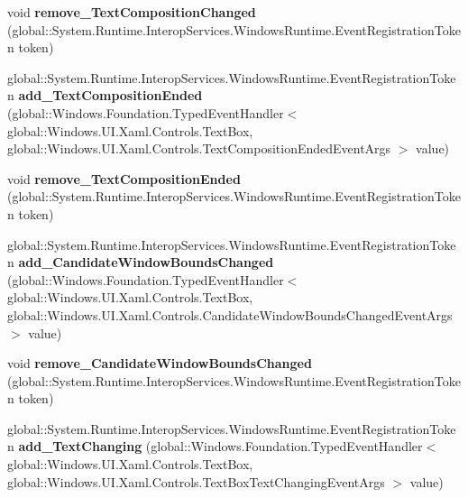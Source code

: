 \begin{DoxyCompactItemize}
void {\bfseries remove\+\_\+\+Text\+Composition\+Changed} (global\+::\+System.\+Runtime.\+Interop\+Services.\+Windows\+Runtime.\+Event\+Registration\+Token token)
\item 
\mbox{\label{interface_windows_1_1_u_i_1_1_xaml_1_1_controls_1_1_i_text_box3_a954246509dfb0e6ccf8afcceb314875e}} 
global\+::\+System.\+Runtime.\+Interop\+Services.\+Windows\+Runtime.\+Event\+Registration\+Token {\bfseries add\+\_\+\+Text\+Composition\+Ended} (global\+::\+Windows.\+Foundation.\+Typed\+Event\+Handler$<$ global\+::\+Windows.\+U\+I.\+Xaml.\+Controls.\+Text\+Box, global\+::\+Windows.\+U\+I.\+Xaml.\+Controls.\+Text\+Composition\+Ended\+Event\+Args $>$ value)
\item 
\mbox{\label{interface_windows_1_1_u_i_1_1_xaml_1_1_controls_1_1_i_text_box3_a1eca96501dfb3670f5fe1de3606e2c05}} 
void {\bfseries remove\+\_\+\+Text\+Composition\+Ended} (global\+::\+System.\+Runtime.\+Interop\+Services.\+Windows\+Runtime.\+Event\+Registration\+Token token)
\item 
\mbox{\label{interface_windows_1_1_u_i_1_1_xaml_1_1_controls_1_1_i_text_box3_af4821dda073f7c190c8b91cbd457a08d}} 
global\+::\+System.\+Runtime.\+Interop\+Services.\+Windows\+Runtime.\+Event\+Registration\+Token {\bfseries add\+\_\+\+Candidate\+Window\+Bounds\+Changed} (global\+::\+Windows.\+Foundation.\+Typed\+Event\+Handler$<$ global\+::\+Windows.\+U\+I.\+Xaml.\+Controls.\+Text\+Box, global\+::\+Windows.\+U\+I.\+Xaml.\+Controls.\+Candidate\+Window\+Bounds\+Changed\+Event\+Args $>$ value)
\item 
\mbox{\label{interface_windows_1_1_u_i_1_1_xaml_1_1_controls_1_1_i_text_box3_a0bc959a10affe7408662639bed13c278}} 
void {\bfseries remove\+\_\+\+Candidate\+Window\+Bounds\+Changed} (global\+::\+System.\+Runtime.\+Interop\+Services.\+Windows\+Runtime.\+Event\+Registration\+Token token)
\item 
\mbox{\label{interface_windows_1_1_u_i_1_1_xaml_1_1_controls_1_1_i_text_box3_a920756886d20926b07cab72000c0e58c}} 
global\+::\+System.\+Runtime.\+Interop\+Services.\+Windows\+Runtime.\+Event\+Registration\+Token {\bfseries add\+\_\+\+Text\+Changing} (global\+::\+Windows.\+Foundation.\+Typed\+Event\+Handler$<$ global\+::\+Windows.\+U\+I.\+Xaml.\+Controls.\+Text\+Box, global\+::\+Windows.\+U\+I.\+Xaml.\+Controls.\+Text\+Box\+Text\+Changing\+Event\+Args $>$ value)

\end{DoxyCompactItemize}
